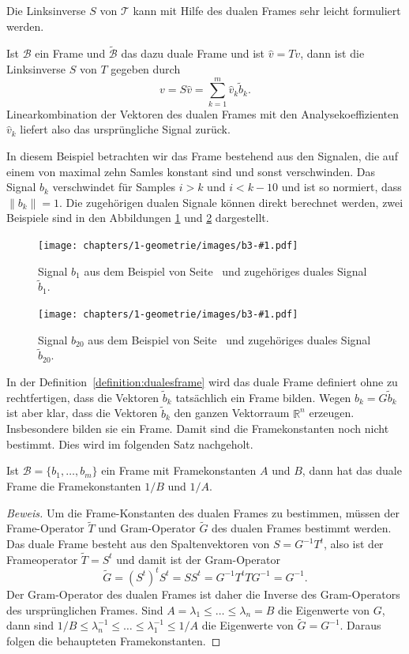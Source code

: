 Die Linksinverse $S$ von $\mathcal{T}$ kann mit Hilfe des dualen Frames
sehr leicht formuliert werden.

\begin{satz}
Ist $\mathcal{B}$ ein Frame und $\tilde{\mathcal{B}}$ das dazu duale
Frame und ist $\hat{v} = Tv$, dann ist die Linksinverse $S$ von $T$
gegeben durch
\[
v
=
S\hat{v}
=
\sum_{k=1}^m \hat{v}_k \tilde{b}_k.
\]
Linearkombination der Vektoren des dualen Frames mit den Analysekoeffizienten
$\hat{v}_k$ liefert also das ursprüngliche Signal zurück.
\end{satz}

\begin{beispiel}
\label{beispiel3}
In diesem Beispiel betrachten wir das Frame bestehend aus den
Signalen, die auf einem von maximal zehn Samles konstant sind
und sonst verschwinden.
Das Signal $b_k$ verschwindet für Samples $i>k$ und $i<k-10$
und ist so normiert, dass $\|b_k\|=1$.
Die zugehörigen dualen Signale können direkt berechnet werden,
zwei Beispiele sind in den Abbildungen \ref{b3-01} und \ref{b3-05}
dargestellt.
\def\beispieldrei#1#2{
\begin{figure}
\centering
\texttt{[image: chapters/1-geometrie/images/b3-\#1.pdf]}
\caption{Signal $b_{#2}$ aus dem Beispiel von Seite~\pageref{beispiel3}
und zugehöriges duales Signal $\tilde{b}_{#2}$.
\label{b3-#1}}
\end{figure}
}
\beispieldrei{01}{1}
\beispieldrei{05}{20}
\end{beispiel}

In der Definition~\ref{definition:dualesframe} wird das duale Frame
definiert ohne zu rechtfertigen, dass die Vektoren $\tilde{b}_k$ 
tatsächlich ein Frame bilden.
Wegen $b_k=G\tilde{b}_k$ ist aber klar, dass die Vektoren $\tilde{b}_k$
den ganzen Vektorraum $\mathbb R^n$ erzeugen.
Insbesondere bilden sie ein Frame.
Damit sind die Framekonstanten noch nicht bestimmt.
Dies wird im folgenden Satz nachgeholt.

\begin{satz}
Ist $\mathcal{B}=\{b_1,\dots,b_m\}$ ein Frame mit Framekonstanten
$A$ und $B$, dann hat das duale Frame die Framekonstanten $1/B$ und $1/A$.
\end{satz}

\begin{proof}[Beweis]
Um die Frame-Konstanten des dualen Frames zu bestimmen,
müssen der Frame-Operator $\tilde{T}$ und Gram-Operator $\tilde{G}$
des dualen Frames bestimmt werden.
Das duale Frame besteht aus den Spaltenvektoren von $S=G^{-1}T^t$,
also ist der Frameoperator $\tilde{T}=S^t$ und damit ist der Gram-Operator
\[
\tilde{G}
=
(S^t)^tS^t
=
SS^t
=
G^{-1}T^tTG^{-1}
=
G^{-1}.
\]
Der Gram-Operator des dualen Frames ist daher die Inverse des
Gram-Operators des ursprünglichen Frames.
Sind $A=\lambda_1\le \dots\le \lambda_n=B$ die Eigenwerte  von $G$,
dann sind
$1/B\le \lambda_n^{-1} \le \dots \le \lambda_1^{-1}\le 1/A$ 
die Eigenwerte von $\tilde{G}=G^{-1}$.
Daraus folgen die behaupteten Framekonstanten.
\end{proof}

